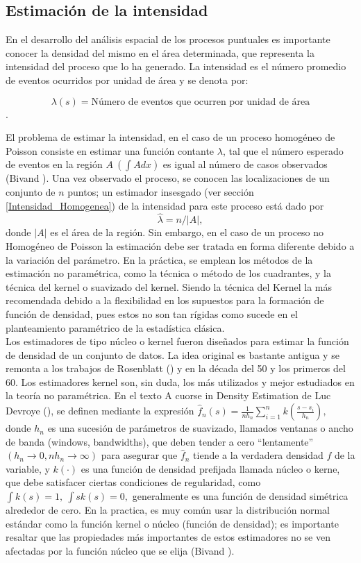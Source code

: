 \documentclass[12pt]{report}
\begin{document}
		
		\subsection{Estimación de la intensidad}{\label{Estimacion}}		
		
		En el desarrollo del análisis espacial de los procesos puntuales es importante conocer la densidad del mismo en el área determinada, que representa la intensidad del proceso que lo ha generado. La intensidad es el número promedio de eventos ocurridos por unidad de área y se denota por: 
		
		\[ \lambda(s)  = \text{Número de eventos que ocurren por unidad de área}\].
		
		El problema de estimar la intensidad, en el caso de un proceso homogéneo de Poisson  consiste en estimar una función contante $ \lambda$, tal que el número esperado de eventos en la región $A \: (\int Adx)$  es igual al número de casos observados (Bivand  \cite{Roger}).   Una vez observado el proceso, se conocen las localizaciones de un conjunto de $n$ puntos; un estimador insesgado (ver sección \ref{Intensidad_Homogenea}) de la intensidad para este proceso está dado por \[ \hat{\lambda} = n/|A|,\] donde $|A|$ es el área de la región. Sin embargo, en el caso de un proceso no Homogéneo de Poisson la estimación debe ser tratada en forma diferente debido a la variación del parámetro. En la práctica, se emplean los métodos de la estimación no paramétrica, como la técnica o método de los cuadrantes, y la  técnica del kernel o suavizado  del kernel. Siendo la técnica del Kernel la más  recomendada   debido a la flexibilidad en los supuestos para la formación de función de densidad, pues estos no son tan rígidas como sucede en el planteamiento paramétrico de la estadística clásica.\\
		Los estimadores de tipo núcleo o kernel fueron diseñados para estimar la función de densidad de un conjunto de datos. La idea original es bastante antigua y se remonta a los trabajos de Rosenblatt (\cite{Devroye})  y   en la década del 50 y los primeros del 60. Los estimadores kernel son, sin duda, los más utilizados y mejor estudiados en la teoría no paramétrica. En el texto  A cuorse in Density Estimation de Luc Devroye (\cite{Devroye}), se definen mediante la expresión  $ \widehat{f}_{n}(s)  = \frac{1}{ nh_{n} } \sum_{i=1}^{n} k( \frac{ s -  s_{i}  }{h_{n}} ), $   donde $h_{n}$ es una sucesión de parámetros de suavizado, llamados ventanas o ancho de banda (windows, bandwidths), que deben tender a cero “lentamente” $(h_{n} \rightarrow 0, n h_{n} \rightarrow \infty)$ para  asegurar que   $\widehat{f}_{n}$ tiende a la verdadera densidad $f $  de la variable, y $k(\cdot)$ es una función de densidad prefijada llamada núcleo o kerne, que debe satisfacer ciertas condiciones de regularidad, como $ \int k(s) = 1, \:  \int s k(s) = 0,$  generalmente es una función de densidad simétrica alrededor de cero. En la practica, es muy  común usar la distribución normal estándar como la función  kernel o núcleo (función de densidad); es importante resaltar que las propiedades más importantes de estos estimadores no se ven afectadas por la función núcleo que se elija (Bivand  \cite{Roger}). \\
		
\end{document}
